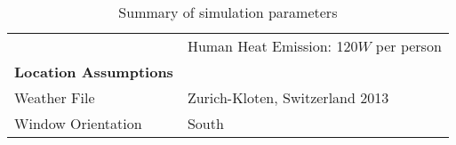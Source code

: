 \begin{table*}
\begin{tabular*}{\textwidth}{ll}
                              & Human Heat Emission: 120$W$ per person                                       \\
\textbf{Location Assumptions} &                                        \\
Weather File                  & Zurich-Kloten, Switzerland 2013 \cite{remund1997meteonorm}       \\
Window Orientation                   & South                                  \\
\hline
\end{tabular*}
\caption{Summary of simulation parameters}
\label{tab:AssumptionsOpp}
\end{table*}








